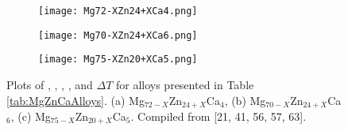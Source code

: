 \documentclass[a4paper,12pt,oneside]{report}%
\begin{document}
\begin{figure}[bp]
	\centering
	\begin{subfigure}[htbp]{0.49\textwidth}
		\texttt{[image: Mg72-XZn24+XCa4.png]}
		\caption{}
		\label{fig:Mg72xZn24xCa4}
	\end{subfigure}
	\begin{subfigure}[htbp]{0.49\textwidth}
		\texttt{[image: Mg70-XZn24+XCa6.png]}
		\caption{}
		\label{fig:Mg70xZn24xCa6}
	\end{subfigure}
	\begin{subfigure}[htbp]{0.49\textwidth}
		\texttt{[image: Mg75-XZn20+XCa5.png]}
		\caption{}
		\label{fig:Mg75xZn20xCa5}
	\end{subfigure}
	\caption{Plots of \Tg, \Tx, \Tm, \Tl, and $\Delta T$ for alloys presented in Table \ref{tab:MgZnCaAlloys}. (a) Mg$_{72-X}$Zn$_{24+X}$Ca$_{4}$, (b) Mg$_{70-X}$Zn$_{24+X}$Ca$_{6}$, (c) Mg$_{75-X}$Zn$_{20+X}$Ca$_{5}$. Compiled from [21, 41, 56, 57, 63].}%
	\label{fig:MgZnCaPlots}
\end{figure}
    
\end{document}
